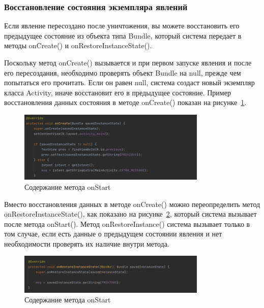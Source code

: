 \subsubsection{Восстановление состояния экземпляра явлений}
Если явление пересоздано после уничтожения, вы можете восстановить его
предыдущее состояние из объекта типа Bundle, который система передает в
методы onCreate() и onRestoreInstanceState().\par
Поскольку метод onCreate() вызывается и при первом запуске явления и
после его пересоздания, необходимо проверять объект Bundle на null, прежде
чем попытаться его прочитать. Если он равен null, система создаст новый
экземпляр класса Activity, иначе восстановит его в предыдущее состояние.
Пример восстановления данных состояния в методе onCreate() показан
на рисунке~\ref{fig:activity:onRestoreInstanceState}.
\begin{figure}[h!tp]
	\centering
	\includegraphics[width=0.8\textwidth]{Screenshot from 2023-02-24 19-36-15.png}
	\caption{Содержание метода onStart}
	\label{fig:activity:onRestoreInstanceState}
\end{figure}


Вместо восстановления данных в методе onCreate() можно
переопределить метод onRestoreInstanceState(), как показано
на рисунке~\ref{fig:activity:onRestoreInstanceState:2},
который система вызывает после метода onStart().
Метод onRestoreInstance() система вызывает только в
том случае, если есть данные о предыдущем состоянии явления и нет
необходимости проверять их наличие внутри метода.
\begin{figure}[h!tp]
	\centering
	\includegraphics[width=0.8\textwidth]{Screenshot from 2023-02-24 19-38-52.png}
	\caption{Содержание метода onStart}
	\label{fig:activity:onRestoreInstanceState:2}
\end{figure}

